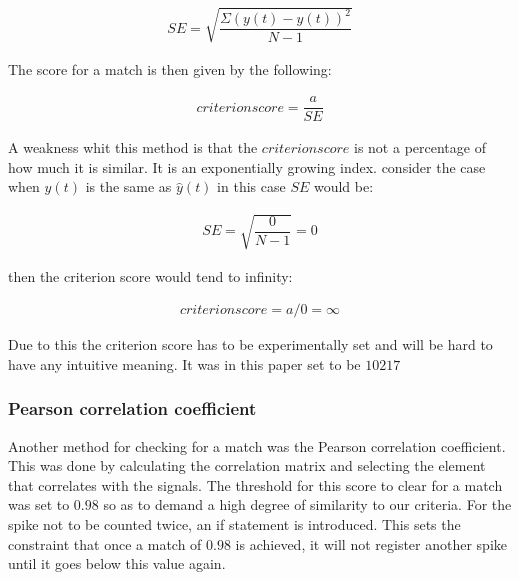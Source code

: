\begin{align}
    SE = \sqrt{\dfrac{\Sigma(y(t)-\hat{y}(t))^2}{N-1}}
\end{align}

The score for a match is then given by the following:

\begin{align}
    criterion score = \dfrac{a}{SE}
\end{align}

A weakness whit this method is that the $criterion score$ is not a percentage of how much it is similar. It is an exponentially growing index. consider the case when $y(t)$ is the same as $\hat{y}(t)$ in this case $SE$ would be:

\begin{align}
    SE = \sqrt{\dfrac{0}{N-1}} = 0
\end{align}

then the criterion score would tend to infinity:

\begin{align}
    criterionscore = a/0 = \infty
\end{align}

Due to this the criterion score has to be experimentally set and will be hard to have any intuitive meaning. It was in this paper set to be $10217$
\\

\subsubsection{Pearson correlation coefficient}

Another method for checking for a match was the Pearson correlation coefficient. This was done by calculating the correlation matrix and selecting the element that correlates with the signals. The threshold for this score to clear for a match was set to $0.98$ so as to demand a high degree of similarity to our criteria. For the spike not to be counted twice, an if statement is introduced. This sets the constraint that once a match of $0.98$ is achieved, it will not register another spike until it goes below this value again. 
